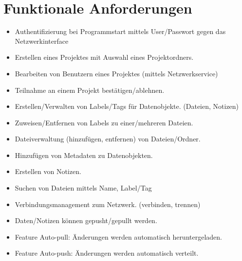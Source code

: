 
\section{Funktionale Anforderungen}


\begin{itemize}
  \item Authentifizierung bei Programmstart mittels User/Passwort gegen das Netzwerkinterface
  \item Erstellen eines Projektes mit Auswahl eines Projektordners.
  \item Bearbeiten von Benutzern eines Projektes (mittels Netzwerkservice)
  \item Teilnahme an einem Projekt bestätigen/ablehnen.
  \item Erstellen/Verwalten von Labels/Tags für Datenobjekte. (Dateien, Notizen)
  \item Zuweisen/Entfernen von Labels zu einer/mehreren Dateien.
  \item Dateiverwaltung (hinzufügen, entfernen) von Dateien/Ordner.
  \item Hinzufügen von Metadaten zu Datenobjekten.
  \item Erstellen von Notizen.
  \item Suchen von Dateien mittels Name, Label/Tag
  \item Verbindungsmanagement zum Netzwerk. (verbinden, trennen)
  \item Daten/Notizen können gepusht/gepullt werden.
  \item Feature Auto-pull: Änderungen werden automatisch heruntergeladen.
  \item Feature Auto-push: Änderungen werden automatisch verteilt.
\end{itemize}